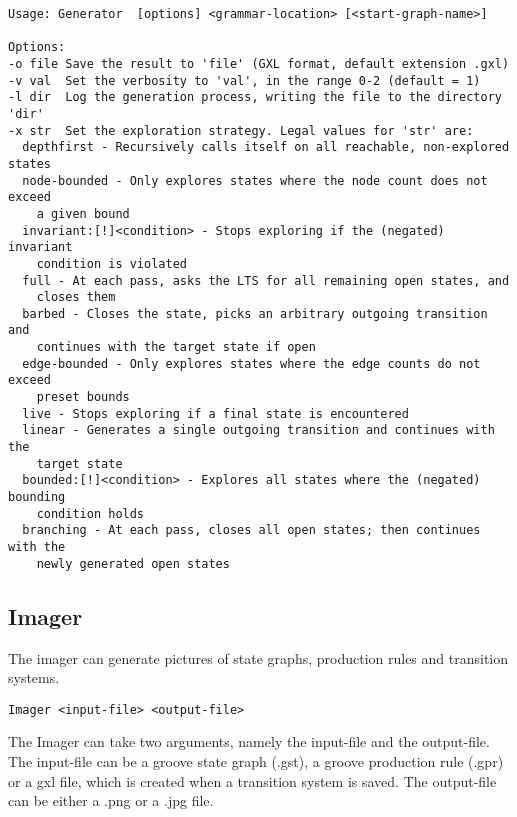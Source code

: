 \begin{verbatim}
Usage: Generator  [options] <grammar-location> [<start-graph-name>]

Options:
-o file Save the result to 'file' (GXL format, default extension .gxl)
-v val  Set the verbosity to 'val', in the range 0-2 (default = 1)
-l dir  Log the generation process, writing the file to the directory 'dir'
-x str  Set the exploration strategy. Legal values for 'str' are:
  depthfirst - Recursively calls itself on all reachable, non-explored states
  node-bounded - Only explores states where the node count does not exceed
    a given bound
  invariant:[!]<condition> - Stops exploring if the (negated) invariant 
    condition is violated
  full - At each pass, asks the LTS for all remaining open states, and 
    closes them
  barbed - Closes the state, picks an arbitrary outgoing transition and 
    continues with the target state if open
  edge-bounded - Only explores states where the edge counts do not exceed
    preset bounds
  live - Stops exploring if a final state is encountered
  linear - Generates a single outgoing transition and continues with the 
    target state
  bounded:[!]<condition> - Explores all states where the (negated) bounding 
    condition holds
  branching - At each pass, closes all open states; then continues with the 
    newly generated open states
\end{verbatim}

\subsection{Imager}

The imager can generate pictures of state graphs, production rules and transition systems.

\begin{verbatim}
Imager <input-file> <output-file>
\end{verbatim}

The Imager can take two arguments, namely the input-file and the output-file. The input-file can be a groove state graph (.gst), a groove production rule (.gpr) or a gxl file, which is created when a transition system is saved. The output-file can be either a .png or a .jpg file.
